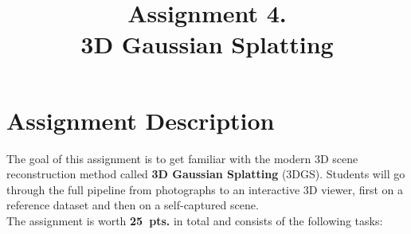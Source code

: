 \documentclass{article}
\title{Assignment 4. \\ 3D Gaussian Splatting}
\date{}
\begin{document}
\maketitle

\section*{Assignment Description}

The goal of this assignment is to get familiar with the modern 3D scene reconstruction
method called \textbf{3D Gaussian Splatting} (3DGS).
Students will go through the full pipeline from photographs to an interactive 3D viewer,
first on a reference dataset and then on a self-captured scene.
\\[4pt]
The assignment is worth \textbf{25~pts.} in total and consists of the following tasks:
\end{document}

